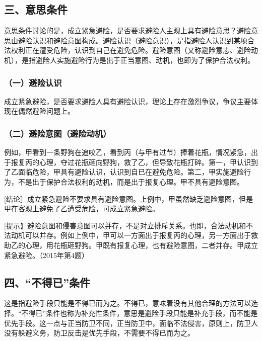 \subsection*{三、意思条件}

意思条件讨论的是，成立紧急避险，是否要求避险人主观上具有避险意思？避险意思由避险认识和避险意图构成。避险认识（避险意识），是指避险人认识到某项合法权利正在遭受危险，认识到自己在避免危险。避险意图（又称避险意志、避险动机），是指避险人实施避险行为是出于正当意图、动机，也即为了保护合法权利。

\subsubsection*{（一）避险认识}

成立紧急避险，是否要求避险人具有避险认识，理论上存在激烈争议，争议主要体现在偶然避险问题上。


\subsubsection*{（二）避险意图（避险动机）}

例如，甲看到一条野狗在追咬乙，看到丙（与甲有过节）捧着花瓶，情况紧急，出于报复丙的心理，夺过花瓶砸向野狗，救了乙，但导致花瓶打碎。第一，甲认识到了乙面临危险，甲具有避险认识，认识到自已在避免危险。第二，甲实施避险行为，不是出于保护合法权利的动机，而是出于报复心理。甲不具有避险意图。

[结论］成立紧急避险不要求具有避险意图。上例中，甲虽然缺乏避险意图，但是甲在客观上避免了乙遭受危险，可成立紧急避险。

[提示】避险意图和侵害意图可以并存，不是对立排斥关系。也即，合法动机和不法动机可以并存。例如上例中，甲可以一方面出于报复丙的心理，另一方面出于救助乙的心理，用花瓶砸野狗。甲既有报复心理，也有避险意图，二者并存。甲成立紧急避险。（2015年第4题）

\subsection*{四、“不得已”条件}

这是指避险手段只能是不得已而为之。不得已，意味着没有其他合理的方法可以选择。“不得已”条件也称为补充性条件，意思是避险手段只能是补充手段，而不能是优先手段。这一点与正当防卫不同，正当防卫中，面临不法侵害，原则上，防卫人没有躲避义务，防卫反击是优先手段，不需要不得已而为之。

